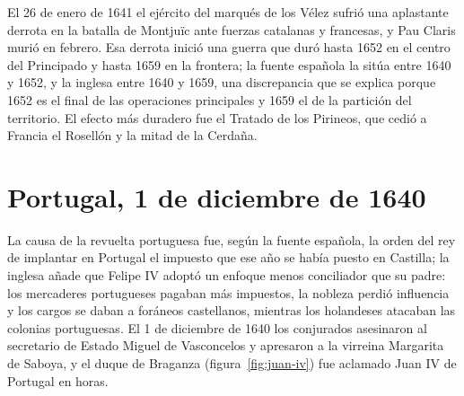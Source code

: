 \documentclass{book}
\begin{document}
El 26 de enero de 1641 el ejército del marqués de los Vélez sufrió una aplastante derrota en la batalla de Montjuïc ante fuerzas catalanas y francesas, y Pau Claris murió en febrero. Esa derrota inició una guerra que duró hasta 1652 en el centro del Principado y hasta 1659 en la frontera; la fuente española la sitúa entre 1640 y 1652, y la inglesa entre 1640 y 1659, una discrepancia que se explica porque 1652 es el final de las operaciones principales y 1659 el de la partición del territorio. El efecto más duradero fue el Tratado de los Pirineos, que cedió a Francia el Rosellón y la mitad de la Cerdaña.


\section{Portugal, 1 de diciembre de 1640}

La causa de la revuelta portuguesa fue, según la fuente española, la orden del rey de implantar en Portugal el impuesto que ese año se había puesto en Castilla; la inglesa añade que Felipe IV adoptó un enfoque menos conciliador que su padre: los mercaderes portugueses pagaban más impuestos, la nobleza perdió influencia y los cargos se daban a foráneos castellanos, mientras los holandeses atacaban las colonias portuguesas. El 1 de diciembre de 1640 los conjurados asesinaron al secretario de Estado Miguel de Vasconcelos y apresaron a la virreina Margarita de Saboya, y el duque de Braganza (figura~\ref{fig:juan-iv}) fue aclamado Juan IV de Portugal en horas.

\end{document}
